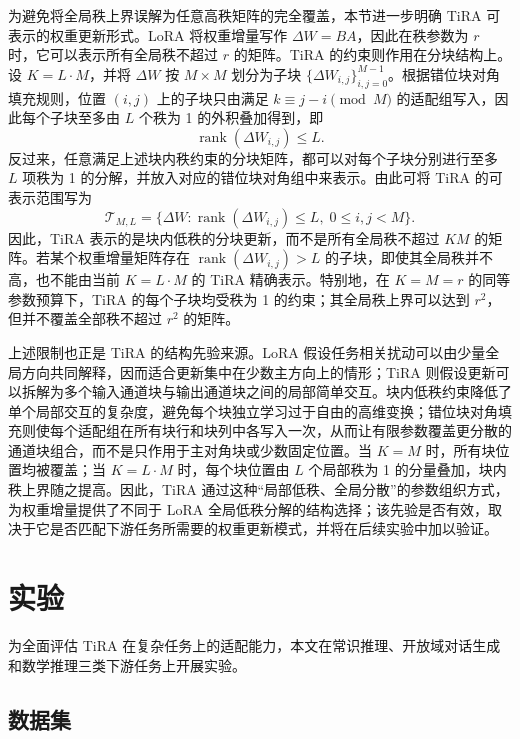 ﻿\documentclass[UTF8,a4paper,11pt]{ctexart}
\newcommand{\DeltaW}{\Delta W}
\newcommand{\rank}{\operatorname{rank}}
\begin{document}
为避免将全局秩上界误解为任意高秩矩阵的完全覆盖，本节进一步明确 TiRA 可表示的权重更新形式。LoRA 将权重增量写作 $\DeltaW=BA$，因此在秩参数为 $r$ 时，它可以表示所有全局秩不超过 $r$ 的矩阵。TiRA 的约束则作用在分块结构上。设 $K=L\cdot M$，并将 $\DeltaW$ 按 $M\times M$ 划分为子块 $\{\Delta W_{i,j}\}_{i,j=0}^{M-1}$。根据错位块对角填充规则，位置 $(i,j)$ 上的子块只由满足 $k\equiv j-i \pmod M$ 的适配组写入，因此每个子块至多由 $L$ 个秩为 1 的外积叠加得到，即
\begin{equation}
    \rank(\Delta W_{i,j})\leq L.
\end{equation}
反过来，任意满足上述块内秩约束的分块矩阵，都可以对每个子块分别进行至多 $L$ 项秩为 1 的分解，并放入对应的错位块对角组中来表示。由此可将 TiRA 的可表示范围写为
\begin{equation}
    \mathcal{T}_{M,L}=\{\DeltaW:\rank(\Delta W_{i,j})\leq L,\;0\leq i,j<M\}.
\end{equation}
因此，TiRA 表示的是块内低秩的分块更新，而不是所有全局秩不超过 $KM$ 的矩阵。若某个权重增量矩阵存在 $\rank(\Delta W_{i,j})>L$ 的子块，即使其全局秩并不高，也不能由当前 $K=L\cdot M$ 的 TiRA 精确表示。特别地，在 $K=M=r$ 的同等参数预算下，TiRA 的每个子块均受秩为 1 的约束；其全局秩上界可以达到 $r^2$，但并不覆盖全部秩不超过 $r^2$ 的矩阵。

上述限制也正是 TiRA 的结构先验来源。LoRA 假设任务相关扰动可以由少量全局方向共同解释，因而适合更新集中在少数主方向上的情形；TiRA 则假设更新可以拆解为多个输入通道块与输出通道块之间的局部简单交互。块内低秩约束降低了单个局部交互的复杂度，避免每个块独立学习过于自由的高维变换；错位块对角填充则使每个适配组在所有块行和块列中各写入一次，从而让有限参数覆盖更分散的通道块组合，而不是只作用于主对角块或少数固定位置。当 $K=M$ 时，所有块位置均被覆盖；当 $K=L\cdot M$ 时，每个块位置由 $L$ 个局部秩为 1 的分量叠加，块内秩上界随之提高。因此，TiRA 通过这种“局部低秩、全局分散”的参数组织方式，为权重增量提供了不同于 LoRA 全局低秩分解的结构选择；该先验是否有效，取决于它是否匹配下游任务所需要的权重更新模式，并将在后续实验中加以验证。

\section{实验}

为全面评估 TiRA 在复杂任务上的适配能力，本文在常识推理、开放域对话生成和数学推理三类下游任务上开展实验。

\subsection{数据集}
\end{document}
